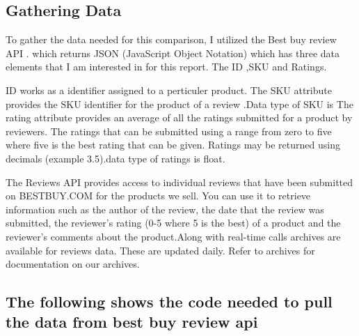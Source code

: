 \documentclass{article}\usepackage[]{graphicx}\usepackage[]{color}
\begin{document}
\subsection*{Gathering Data}

\par To gather the data needed for this comparison, I utilized the Best buy review
API . which returns JSON (JavaScript Object
Notation) which has three data elements that I am interested in for this report.
The  ID ,SKU and Ratings.
\par ID works as a identifier assigned to a perticuler product.
 \smallskip The SKU attribute provides the SKU identifier for the product of a review .Data type of SKU is 
\smallskip The rating attribute provides an average of all the ratings submitted for a product by reviewers. The ratings that can be submitted using a range from zero to five where five is the best rating that can be given. Ratings may be returned using decimals (example 3.5).data type of ratings is float.
\smallskip
\par The Reviews API provides access to individual reviews that have been submitted on BESTBUY.COM for the products we sell. You can use it to retrieve information such as the author of the review, the date that the review was submitted, the reviewer's rating (0-5 where 5 is the best) of a product and the reviewer's comments about the product.Along with real-time calls archives are available for reviews data. These are updated daily. Refer to archives for documentation on our archives.
\smallskip
\smallskip
\subsection*{The following shows the code needed to pull the data from best buy review api}
\end{document}
